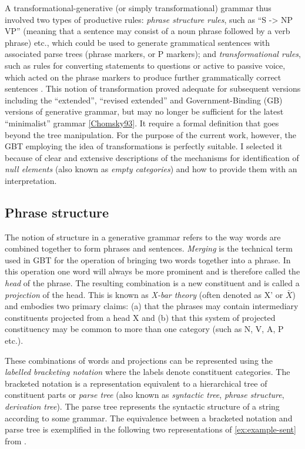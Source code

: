 A transformational-generative (or simply transformational) grammar thus involved two types of productive rules: \textit{phrase structure rules}, such as ``S -> NP VP'' (meaning that a sentence may consist of a noun phrase followed by a verb phrase) etc., which could be used to generate grammatical sentences with associated parse trees (phrase markers, or P markers); and \textit{transformational rules}, such as rules for converting statements to questions or active to passive voice, which acted on the phrase markers to produce further grammatically correct sentences \citep[59-66]{Bach1966}. This notion of transformation proved adequate for subsequent versions including the ``extended'', ``revised extended'' and Government-Binding (GB) versions of generative grammar, but may no longer be sufficient for the latest ``minimalist'' grammar \ref{Chomsky93}. It require a formal definition that goes beyond the tree manipulation. For the purpose of the current work, however, the GBT employing the idea of transformations is perfectly suitable. I selected it because of clear and extensive descriptions of the mechanisms for identification of \textit{null elements} (also known as \textit{empty categories}) and how to provide them with an interpretation. 

\subsection{Phrase structure}
The notion of structure in a generative grammar refers to the way words are combined together to form phrases and sentences. \textit{Merging} is the technical term used in GBT for the operation of bringing two words together into a phrase. In this operation one word will always be more prominent and is therefore called the \textit{head} of the phrase. The resulting combination is a new constituent and is called a \textit{projection} of the head. This is known as \textit{X-bar theory} (often denoted as X' or $\bar{X}$) and embodies two primary claims: (a) that the phrases may contain intermediary constituents projected from a head X and (b) that this system of projected constituency may be common to more than one category (such as N, V, A, P etc.).

These combinations of words and projections can be represented using the \textit{labelled bracketing notation} where the labels denote constituent categories. The bracketed notation is a representation equivalent to a hierarchical tree of constituent parts or \textit{parse tree} (also known as \textit{syntactic tree}, \textit{phrase structure}, \textit{derivation tree}). The parse tree represents the syntactic structure of a string according to some grammar. The equivalence between a bracketed notation and parse tree is exemplified in the following two representations of \ref{ex:example-sent} from \citep[83]{Haegeman1991}.

